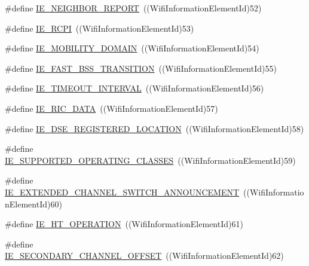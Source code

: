 \begin{DoxyCompactItemize}
\item 
\#define \hyperlink{wifi-information-element_8h_ab7da21fa9620b442e2ab9c4573c250ea}{I\+E\+\_\+\+N\+E\+I\+G\+H\+B\+O\+R\+\_\+\+R\+E\+P\+O\+RT}~((Wifi\+Information\+Element\+Id)52)
\item 
\#define \hyperlink{wifi-information-element_8h_ab507b627f512ea3f7f27b6cfbf4bb895}{I\+E\+\_\+\+R\+C\+PI}~((Wifi\+Information\+Element\+Id)53)
\item 
\#define \hyperlink{wifi-information-element_8h_ae9b1b32fd6a0ec1a8afd06a34e07e359}{I\+E\+\_\+\+M\+O\+B\+I\+L\+I\+T\+Y\+\_\+\+D\+O\+M\+A\+IN}~((Wifi\+Information\+Element\+Id)54)
\item 
\#define \hyperlink{wifi-information-element_8h_aa4dfd0515d182ecf97a77db37793b8ad}{I\+E\+\_\+\+F\+A\+S\+T\+\_\+\+B\+S\+S\+\_\+\+T\+R\+A\+N\+S\+I\+T\+I\+ON}~((Wifi\+Information\+Element\+Id)55)
\item 
\#define \hyperlink{wifi-information-element_8h_a79852ccf7f19c49480bae1eeb484a815}{I\+E\+\_\+\+T\+I\+M\+E\+O\+U\+T\+\_\+\+I\+N\+T\+E\+R\+V\+AL}~((Wifi\+Information\+Element\+Id)56)
\item 
\#define \hyperlink{wifi-information-element_8h_ae478fc22a278ecd0ab85e95338fae9c9}{I\+E\+\_\+\+R\+I\+C\+\_\+\+D\+A\+TA}~((Wifi\+Information\+Element\+Id)57)
\item 
\#define \hyperlink{wifi-information-element_8h_a66a3161f599105d872094f8d3d15d82d}{I\+E\+\_\+\+D\+S\+E\+\_\+\+R\+E\+G\+I\+S\+T\+E\+R\+E\+D\+\_\+\+L\+O\+C\+A\+T\+I\+ON}~((Wifi\+Information\+Element\+Id)58)
\item 
\#define \hyperlink{wifi-information-element_8h_a8ccce8125ccc3447c24b4bc210ffddb4}{I\+E\+\_\+\+S\+U\+P\+P\+O\+R\+T\+E\+D\+\_\+\+O\+P\+E\+R\+A\+T\+I\+N\+G\+\_\+\+C\+L\+A\+S\+S\+ES}~((Wifi\+Information\+Element\+Id)59)
\item 
\#define \hyperlink{wifi-information-element_8h_a7a0215c5bcee511f98c3cc8f7fcd4276}{I\+E\+\_\+\+E\+X\+T\+E\+N\+D\+E\+D\+\_\+\+C\+H\+A\+N\+N\+E\+L\+\_\+\+S\+W\+I\+T\+C\+H\+\_\+\+A\+N\+N\+O\+U\+N\+C\+E\+M\+E\+NT}~((Wifi\+Information\+Element\+Id)60)
\item 
\#define \hyperlink{wifi-information-element_8h_a6ceacdeebef4d1f2a7deb069fc3c7ab1}{I\+E\+\_\+\+H\+T\+\_\+\+O\+P\+E\+R\+A\+T\+I\+ON}~((Wifi\+Information\+Element\+Id)61)
\item 
\#define \hyperlink{wifi-information-element_8h_a39cfc8b3ed6ca106554a7a395ca7b12a}{I\+E\+\_\+\+S\+E\+C\+O\+N\+D\+A\+R\+Y\+\_\+\+C\+H\+A\+N\+N\+E\+L\+\_\+\+O\+F\+F\+S\+ET}~((Wifi\+Information\+Element\+Id)62)
\item 

\end{DoxyCompactItemize}
